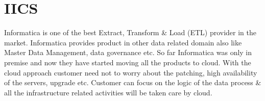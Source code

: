 \section{IICS}

Informatica is one of the best Extract, Transform \& Load (ETL) provider in the market. Informatica provides product in other data related domain also like Master Data Management, data governance etc. So far Informatica was only in premise and now they have started moving all the products to cloud. With the cloud approach customer need not to worry about the patching, high availability of the servers, upgrade etc. Customer can focus on the logic of the data process \& all the infrastructure related activities will be taken care by cloud. \cites{hid-sp18-511-iics}
